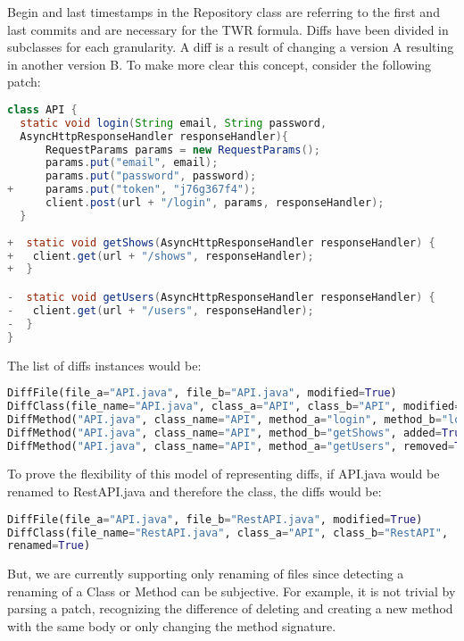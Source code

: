 Begin and last timestamps in the Repository class are referring to the first and last commits and are necessary for the TWR formula. Diffs have been divided in subclasses for each granularity. A diff is a result of changing a version A resulting in another version B. To make more clear this concept, consider the following patch:

\begin{lstlisting}[language=java, caption=Patch in API.java]
class API {
  static void login(String email, String password,
  AsyncHttpResponseHandler responseHandler){
      RequestParams params = new RequestParams();
      params.put("email", email);
      params.put("password", password);
+     params.put("token", "j76g367f4");
      client.post(url + "/login", params, responseHandler);
  }
  
+  static void getShows(AsyncHttpResponseHandler responseHandler) {
+   client.get(url + "/shows", responseHandler);
+  }

-  static void getUsers(AsyncHttpResponseHandler responseHandler) {
-   client.get(url + "/users", responseHandler);
-  }
}
\end{lstlisting}


The list of diffs instances would be:

\begin{lstlisting}[language=python, caption=List of Diff instances]
DiffFile(file_a="API.java", file_b="API.java", modified=True)
DiffClass(file_name="API.java", class_a="API", class_b="API", modified=True)
DiffMethod("API.java", class_name="API", method_a="login", method_b="login", modified=True)
DiffMethod("API.java", class_name="API", method_b="getShows", added=True)
DiffMethod("API.java", class_name="API", method_a="getUsers", removed=True)
\end{lstlisting}


To prove the flexibility of this model of representing diffs, if API.java would be renamed to RestAPI.java and therefore the class, the diffs would be:

\begin{lstlisting}[language=python, caption=Diff instances for a renamed class]
DiffFile(file_a="API.java", file_b="RestAPI.java", modified=True)
DiffClass(file_name="RestAPI.java", class_a="API", class_b="RestAPI",
renamed=True)
\end{lstlisting}

But, we are currently supporting only renaming of files since detecting a renaming of a Class or Method can be subjective. For example, it is not trivial by parsing a patch, recognizing the difference of deleting and creating a new method with the same body or only changing the method signature.

